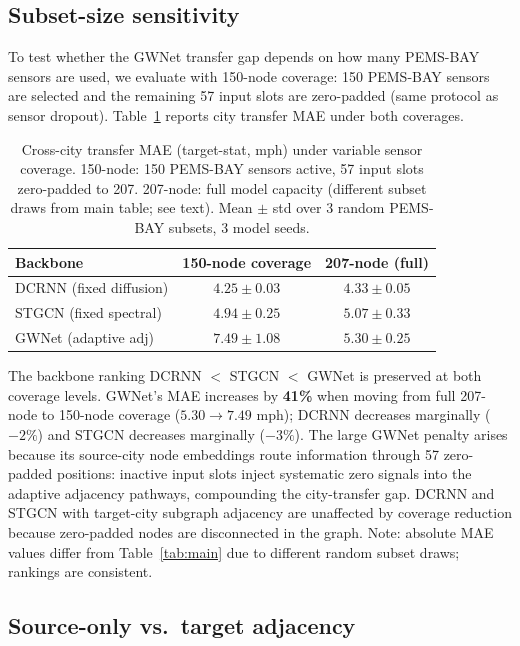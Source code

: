 \subsection{Subset-size sensitivity}
\label{sec:appendix_subset_sensitivity}

To test whether the GWNet transfer gap depends on how many PEMS-BAY sensors are used,
we evaluate with 150-node coverage: 150 PEMS-BAY sensors are selected and the remaining
57 input slots are zero-padded (same protocol as sensor dropout).
Table~\ref{tab:subset_sensitivity} reports city transfer MAE under both coverages.

\begin{table}[h]
\centering
\caption{Cross-city transfer MAE (target-stat, mph) under variable sensor coverage.
150-node: 150 PEMS-BAY sensors active, 57 input slots zero-padded to 207.
207-node: full model capacity (different subset draws from main table; see text).
Mean $\pm$ std over 3 random PEMS-BAY subsets, 3 model seeds.}
\label{tab:subset_sensitivity}
\vskip 0.1in
\small
\begin{tabular}{lcc}
\toprule
\textbf{Backbone} & \textbf{150-node coverage} & \textbf{207-node (full)} \\
\midrule
DCRNN (fixed diffusion) & $4.25 \pm 0.03$ & $4.33 \pm 0.05$ \\
STGCN (fixed spectral)  & $4.94 \pm 0.25$ & $5.07 \pm 0.33$ \\
GWNet (adaptive adj)    & $7.49 \pm 1.08$ & $5.30 \pm 0.25$ \\
\bottomrule
\end{tabular}
\end{table}

The backbone ranking DCRNN $<$ STGCN $<$ GWNet is preserved at both coverage levels.
GWNet's MAE increases by \textbf{41\%} when moving from full 207-node to 150-node coverage
($5.30 \to 7.49$ mph); DCRNN decreases marginally ($-2\%$) and STGCN decreases marginally
($-3\%$).
The large GWNet penalty arises because its source-city node embeddings route information
through 57 zero-padded positions: inactive input slots inject systematic zero signals into
the adaptive adjacency pathways, compounding the city-transfer gap.
DCRNN and STGCN with target-city subgraph adjacency are unaffected by coverage reduction
because zero-padded nodes are disconnected in the graph.
Note: absolute MAE values differ from Table~\ref{tab:main} due to different random subset
draws; rankings are consistent.

\subsection{Source-only vs.\ target adjacency}
\label{sec:appendix_source_adj}

